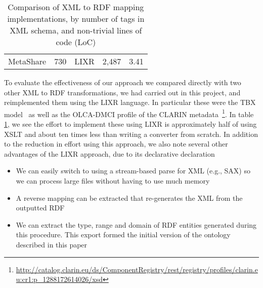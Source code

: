 \documentclass{llncs}
\begin{document}
{\begin{table}
\begin{center}
\begin{tabular}{p{4cm}|cccc}
MetaShare & 730 & LIXR & 2,487 & 3.41 \\
\end{tabular}
\end{center}
\caption{\label{tab:locs}Comparison of XML to RDF mapping implementations,
by number of tags in XML schema, and non-trivial lines of code (LoC)}
\end{table}
To evaluate the effectiveness of our approach we compared directly with two other
XML to RDF transformations, we had carried out in this project, and
reimplemented them using the LIXR language. In particular these were the TBX
model~\cite{iso30042} as well as the OLCA-DMCI profile of the CLARIN
metadata~\footnote{\url{http://catalog.clarin.eu/ds/ComponentRegistry/rest/registry/profiles/clarin.eu:cr1:p\_1288172614026/xsd}}. In table \ref{tab:locs}, we see the
effort to implement these using LIXR is approximately half of using XSLT and
about ten times less than writing a converter from scratch.
In addition to the reduction in effort using this approach, we also note several
other advantages of the LIXR approach, due to its declarative declaration
\begin{itemize}
\item We can easily switch to using a stream-based parse for XML (e.g., SAX)
so we can process large files without having to use much memory
\item A reverse mapping can be extracted that re-generates the XML from the
outputted RDF
\item We can extract the type, range and domain of RDF entities generated
during this procedure. This export formed the initial version of the
ontology described in this paper
\end{itemize}
}
\end{document}
